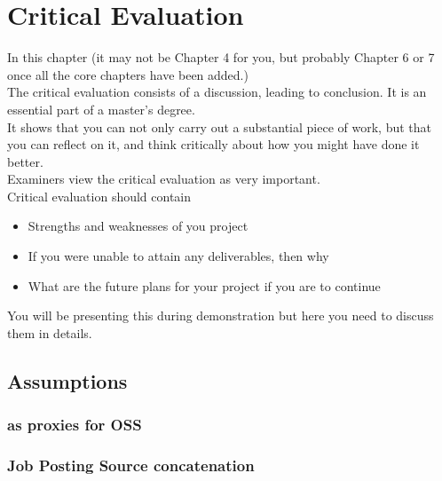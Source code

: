 
\chapter{Critical Evaluation}

In this chapter (it may not be Chapter 4 for you, but probably Chapter 6 or 7 once all the core chapters have been added.)
\\The critical evaluation consists of a discussion, leading to conclusion.  It is an essential part of a master’s degree.
\\It shows that you can not only carry out a substantial piece of work, but that you can reflect on it, and think critically about how you might have done it better.
\\Examiners view the critical evaluation as very important.
\\Critical evaluation should contain
\begin{itemize}
  \item Strengths and weaknesses of you project
  \item If you were unable to attain any deliverables, then why
  \item What are the future plans for your project if you are to continue
\end{itemize}
You will be presenting this during demonstration but here you need to discuss them in details.

\section{Assumptions}

\subsection{\ghrepo{} as proxies for OSS}\label{critical-evaluation:repo-oss-proxy}

\subsection{Job Posting Source concatenation}
